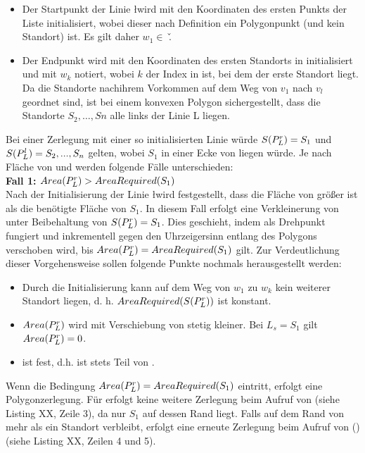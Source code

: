 \documentclass[ngerman]{seminarbeitrag}
\begin{document}
\begin{itemize}
\item Der Startpunkt \ls der Linie \l wird mit den Koordinaten des ersten Punkts der Liste \w initialisiert, wobei dieser nach Definition ein Polygonpunkt (und
kein Standort) ist. Es gilt daher $w_{1} \in$ \v.
\item Der Endpunkt \Le wird mit den Koordinaten des ersten Standorts in \w initialisiert und mit $w_{k}$ notiert, wobei $k$ der Index in \w ist, bei dem der
erste Standort liegt. Da die Standorte nachihrem Vorkommen auf dem Weg von $v_{1}$ nach $v_{l}$ geordnet sind, ist bei einem konvexen Polygon sichergestellt,
dass die Standorte $S_{2},…,S{n}$ alle links der Linie L liegen.
\end{itemize}

Bei einer Zerlegung mit einer so initialisierten Linie würde $S(P_{L}^{r})=S_{1}$ und $S(P_{L}^{l})=S_{2},...,S_{n}$ gelten, wobei $S_{1}$ in einer Ecke von \prl
liegen würde. Je nach Fläche von \prl und  werden folgende Fälle unterschieden: \\

\textbf{Fall 1: $Area(P_{L}^{r})>AreaRequired(S_{1})$} \\
Nach der Initialisierung der Linie \l wird festgestellt, dass die Fläche von \prl größer ist als die benötigte Fläche von $S_{1}$. In diesem Fall erfolgt eine
Verkleinerung von \ar{\mprl} unter Beibehaltung von $S(P_{L}^{r})=S_{1} $. Dies geschieht, indem \Le als Drehpunkt fungiert und \ls inkrementell gegen den Uhrzeigersinn entlang des Polygons
verschoben wird, bis $Area(P_{L}^{r})=AreaRequired(S_{1})$ gilt. Zur Verdeutlichung dieser Vorgehensweise sollen folgende Punkte nochmals herausgestellt werden:

\begin{itemize}
\item Durch die Initialisierung kann auf dem Weg von $w_{1}$ zu $w_{k}$ kein weiterer Standort liegen, d. h. $AreaRequired(S(P_{L}^{r}))$ ist konstant.
\item $Area(P_{L}^{r})$ wird mit Verschiebung von \ls stetig kleiner. Bei $L_{s}=S_{1}$ gilt $Area(P_{L}^{r})=0$.
\item \Le ist fest, d.h.  ist stets Teil von \prl.
\end{itemize}

Wenn die Bedingung $Area(P_{L}^{r})=AreaRequired(S_{1})$ eintritt, erfolgt eine Polygonzerlegung. Für \prl erfolgt keine weitere Zerlegung beim Aufruf von
\con (siehe Listing XX, Zeile 3), da nur $S_{1}$ auf dessen Rand liegt. Falls auf dem Rand von \prl mehr als ein Standort verbleibt, erfolgt eine erneute
Zerlegung beim Aufruf von \con(\pll) (siehe Listing XX, Zeilen 4 und 5).
\end{document}
